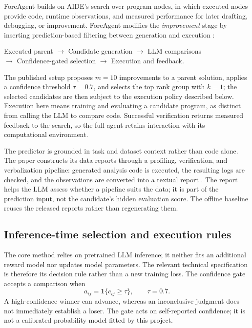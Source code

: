 \documentclass{article}
\begin{document}
ForeAgent builds on AIDE's search over program nodes, in which executed nodes provide code, runtime observations, and measured performance for later drafting, debugging, or improvement. ForeAgent modifies the \emph{improvement} stage by inserting prediction-based filtering between generation and execution \citep[Section~6.2]{zheng2026predict}:
\begin{center}
\small
Executed parent $\longrightarrow$ Candidate generation $\longrightarrow$ LLM comparisons\\[2pt]
$\longrightarrow$ Confidence-gated selection $\longrightarrow$ Execution and feedback.
\end{center}
The published setup proposes $m=10$ improvements to a parent solution, applies a confidence threshold $\tau=0.7$, and selects the top rank group with $k=1$; the selected candidates are then subject to the execution policy described below. Execution here means training and evaluating a candidate program, as distinct from calling the LLM to compare code. Successful verification returns measured feedback to the search, so the full agent retains interaction with its computational environment.

The predictor is grounded in task and dataset context rather than code alone. The paper constructs its data reports through a profiling, verification, and verbalization pipeline: generated analysis code is executed, the resulting logs are checked, and the observations are converted into a textual report \citep[Section~3.4]{zheng2026predict}. The report helps the LLM assess whether a pipeline suits the data; it is part of the prediction input, not the candidate's hidden evaluation score. The offline baseline reuses the released reports rather than regenerating them.

\subsection{Inference-time selection and execution rules}

The core method relies on pretrained LLM inference; it neither fits an additional reward model nor updates model parameters. The relevant technical specification is therefore its decision rule rather than a new training loss. The confidence gate accepts a comparison when
\begin{equation}
  a_{ij}=\mathbf{1}\{c_{ij}\geq\tau\},\qquad \tau=0.7.
  \label{eq:gate}
\end{equation}
A high-confidence winner can advance, whereas an inconclusive judgment does not immediately establish a loser. The gate acts on self-reported confidence; it is not a calibrated probability model fitted by this project.
\end{document}
